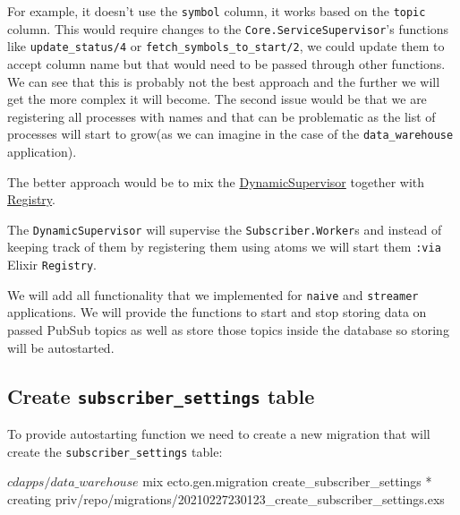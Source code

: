 \documentclass[
]{book}
\newenvironment{Shaded}{\begin{snugshade}}{\end{snugshade}}
\newcommand{\ExtensionTok}[1]{#1}
\newcommand{\NormalTok}[1]{#1}
\begin{document}
For example, it doesn't use the \texttt{symbol} column, it works based on the \texttt{topic} column. This would require changes to the \texttt{Core.ServiceSupervisor}'s functions like \texttt{update\_status/4} or \texttt{fetch\_symbols\_to\_start/2}, we could update them to accept column name but that would need to be passed through other functions. We can see that this is probably not the best approach and the further we will get the more complex it will become. The second issue would be that we are registering all processes with names and that can be problematic as the list of processes will start to grow(as we can imagine in the case of the \texttt{data\_warehouse} application).

The better approach would be to mix the \href{https://hexdocs.pm/elixir/master/DynamicSupervisor.html}{DynamicSupervisor} together with \href{https://hexdocs.pm/elixir/master/Registry.html}{Registry}.

The \texttt{DynamicSupervisor} will supervise the \texttt{Subscriber.Worker}s and instead of keeping track of them by registering them using atoms we will start them \texttt{:via} Elixir \texttt{Registry}.

We will add all functionality that we implemented for \texttt{naive} and \texttt{streamer} applications. We will provide the functions to start and stop storing data on passed PubSub topics as well as store those topics inside the database so storing will be autostarted.

\hypertarget{create-subscriber_settings-table}{%
\subsection{\texorpdfstring{Create \texttt{subscriber\_settings} table}{Create subscriber\_settings table}}\label{create-subscriber_settings-table}}

To provide autostarting function we need to create a new migration that will create the \texttt{subscriber\_settings} table:

\begin{Shaded}
\begin{Highlighting}[]
\ExtensionTok{$}\NormalTok{ cd apps/data\_warehouse}
\ExtensionTok{$}\NormalTok{ mix ecto.gen.migration create\_subscriber\_settings}
\ExtensionTok{*}\NormalTok{ creating priv/repo/migrations/20210227230123\_create\_subscriber\_settings.exs}
\end{Highlighting}
\end{Shaded}
\end{document}
